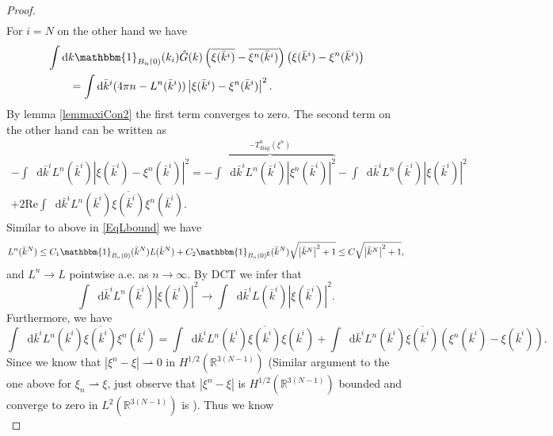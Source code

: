 \documentclass[a4paper,11pt]{article}
\newcommand{\Real}{\text{Re}}
\newcommand{\abs}[1]{\left\lvert #1 \right\rvert}
\newcommand*\diff{\mathop{}\!\mathrm{d}}
\newcommand{\R}{\mathbb{R}}
\numberwithin{equation}{section}
\begin{document}
\begin{proof}
\begin{equation}
\begin{aligned}
\end{aligned}
\end{equation}
For $i=N$ on the other hand we have \begin{equation}
\begin{aligned}
&\int\diff k \mathbbm{1}_{B_n(0)}(k_i)\hat{G}(k)\left(\overline{\xi(\bar{k}^i)}-\overline{\xi^n(\bar{k}^i)}\right)\left(\xi(\bar{k}^i)-\xi^n(\bar{k}^i)\right)\\&\qquad=\int\diff\bar{k}^i(4\pi n-L^n(\bar{k}^i))\left\lvert\xi(\bar{k}^i)-\xi^n(\bar{k}^i)\right\rvert^2.
\end{aligned}
\end{equation}
By lemma \ref{lemmaxiCon2} the first term converges to zero. The second term on the other hand can be written as \begin{equation}
\begin{aligned}
-\int\diff\bar{k}^iL^n(\bar{k}^i)\left\lvert\xi(\bar{k}^i)-\xi^n(\bar{k}^i)\right\rvert^2=\overbrace{-\int\diff \bar{k}^i L^n(\bar{k}^i)\abs{\xi^n(\bar{k}^i)}^2}^{-T_{\text{diag}}^n(\xi^n)}-\int\diff \bar{k}^i L^n(\bar{k}^i)\abs{\xi(\bar{k}^i)}^2\\+2\Real\int\diff \bar{k}^i L^n(\bar{k}^i)\overline{\xi(\bar{k}^i)}\xi^n(\bar{k}^i).
\end{aligned}
\end{equation}
Similar to above in \eqref{EqLbound} we have\begin{equation}
L^n(\bar{k}^N)\leq C_1 \mathbbm{1}_{B_n(0)}(\bar{k}^N)L(\bar{k}^N)+C_2\mathbbm{1}_{B_n(0)^\complement}(\bar{k}^N)\sqrt{\abs{\bar{k}^N}^2+1}\leq C\sqrt{\abs{\bar{k}^N}^2+1},
\end{equation}
and $ L^n\to L $ pointwise a.e. as $ n\to \infty $. By DCT we infer that \begin{equation}\label{EqLnCon}
\int\diff \bar{k}^i L^n(\bar{k}^i)\abs{\xi(\bar{k}^i)}^2\to\int\diff \bar{k}^i L(\bar{k}^i)\abs{\xi(\bar{k}^i)}^2.
\end{equation} 
Furthermore, we have \begin{equation}\label{EqLnCon2}
\int\diff \bar{k}^i L^n(\bar{k}^i)\overline{\xi(\bar{k}^i)}\xi^n(\bar{k}^i)=\int\diff \bar{k}^i L^n(\bar{k}^i)\overline{\xi(\bar{k}^i)}\xi(\bar{k}^i)+\int\diff \bar{k}^i L^n(\bar{k}^i)\overline{\xi(\bar{k}^i)}(\xi^n(\bar{k}^i)-\xi(\bar{k}^i)).
\end{equation}
Since we know that $ \abs{\xi^n-\xi}\rightharpoonup0 $ in $ H^{1/2}(\R^{3(N-1)}) $ (Similar argument to the one above for $ \xi_n\rightharpoonup\xi $, just observe that $ \abs{\xi^n-\xi} $ is $ H^{1/2}(\R^{3(N-1)}) $ bounded and converge to zero in $ L^{2}(\R^{3(N-1)}) $ is ). Thus we know\begin{equation}

\end{equation}
\end{proof}
\end{document}
